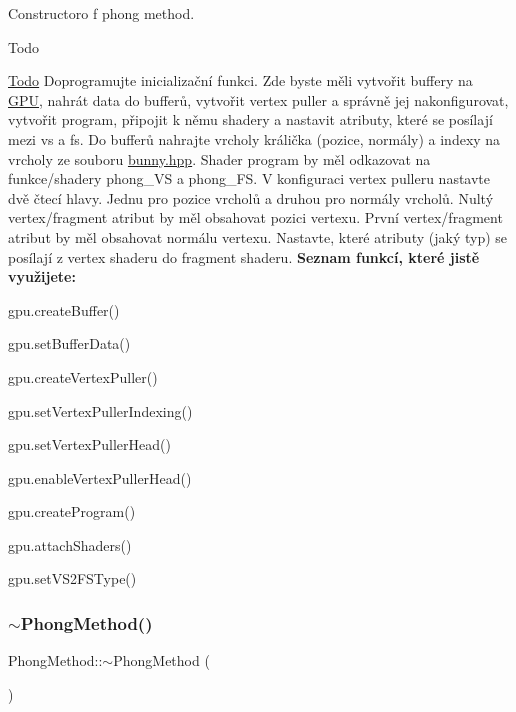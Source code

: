 Constructoro f phong method. 

\begin{DoxyRefDesc}{Todo}
\item[\hyperlink{todo__todo000040}{Todo}]Doprogramujte inicializační funkci. Zde byste měli vytvořit buffery na \hyperlink{classGPU}{G\+PU}, nahrát data do bufferů, vytvořit vertex puller a správně jej nakonfigurovat, vytvořit program, připojit k němu shadery a nastavit atributy, které se posílají mezi vs a fs. Do bufferů nahrajte vrcholy králička (pozice, normály) a indexy na vrcholy ze souboru \hyperlink{bunny_8hpp}{bunny.\+hpp}. Shader program by měl odkazovat na funkce/shadery phong\+\_\+\+VS a phong\+\_\+\+FS. V konfiguraci vertex pulleru nastavte dvě čtecí hlavy. Jednu pro pozice vrcholů a druhou pro normály vrcholů. Nultý vertex/fragment atribut by měl obsahovat pozici vertexu. První vertex/fragment atribut by měl obsahovat normálu vertexu. Nastavte, které atributy (jaký typ) se posílají z vertex shaderu do fragment shaderu. {\bfseries Seznam funkcí, které jistě využijete\+:}
\begin{DoxyItemize}
\item gpu.\+create\+Buffer()
\item gpu.\+set\+Buffer\+Data()
\item gpu.\+create\+Vertex\+Puller()
\item gpu.\+set\+Vertex\+Puller\+Indexing()
\item gpu.\+set\+Vertex\+Puller\+Head()
\item gpu.\+enable\+Vertex\+Puller\+Head()
\item gpu.\+create\+Program()
\item gpu.\+attach\+Shaders()
\item gpu.\+set\+V\+S2\+F\+S\+Type() 
\end{DoxyItemize}\end{DoxyRefDesc}
\mbox{\label{group__cpu__side_ga64fbf177f01aca9027d510611a2dad73}} 
\subsubsection{\texorpdfstring{$\sim$\+Phong\+Method()}{~PhongMethod()}}
{\footnotesize\ttfamily Phong\+Method\+::$\sim$\+Phong\+Method (\begin{DoxyParamCaption}{ }\end{DoxyParamCaption})\hspace{0.3cm}{\ttfamily [virtual]}}



